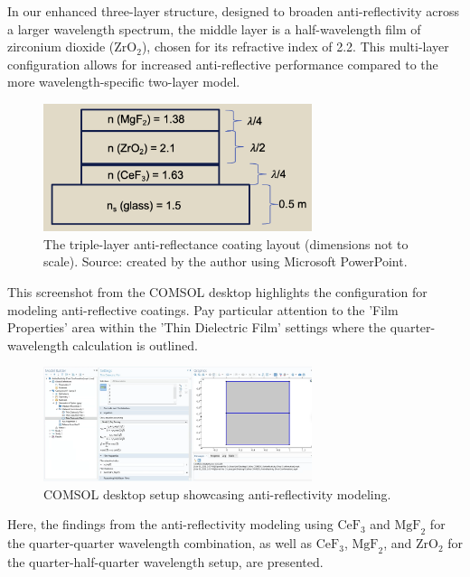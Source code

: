 In our enhanced three-layer structure, designed to broaden anti-reflectivity across a larger wavelength spectrum, the middle layer is a half-wavelength film of zirconium dioxide ($\text{ZrO}_2$), chosen for its refractive index of 2.2. This multi-layer configuration allows for increased anti-reflective performance compared to the more wavelength-specific two-layer model.

\begin{figure}[H]
  \centering
  \includegraphics[width=0.7\textwidth]{Chapters/Figures/Chapter 4 Figures/Antireflective Triple-Layer (PowerPoint).png}
  \caption{The triple-layer anti-reflectance coating layout (dimensions not to scale). Source: created by the author using Microsoft PowerPoint.}
  \label{fig:Antireflective Triple-Layer (PowerPoint)}
\end{figure}

This screenshot from the COMSOL desktop highlights the configuration for modeling anti-reflective coatings. Pay particular attention to the 'Film Properties' area within the 'Thin Dielectric Film' settings where the quarter-wavelength calculation is outlined.

\begin{figure}[H]
  \centering
  \includegraphics[width=0.7\textwidth]{Chapters/Figures/Chapter 4 Figures/COMSOL Desktop Showcasing Antireflectivity Setup.png}
  \caption{COMSOL desktop setup showcasing anti-reflectivity modeling.}
  \label{fig:COMSOL desktop showcasing antireflectivity}
\end{figure}

Here, the findings from the anti-reflectivity modeling using $\text{CeF}_3$ and $\text{MgF}_2$ for the quarter-quarter wavelength combination, as well as $\text{CeF}_3$, $\text{MgF}_2$, and $\text{ZrO}_2$ for the quarter-half-quarter wavelength setup, are presented.


